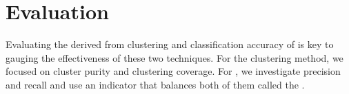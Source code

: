 \chapter{Evaluation}\label{chap:evaluation}
Evaluating the \bslongs{} derived from \dbased{} clustering and classification accuracy of \krap{} is key to gauging the effectiveness of these two techniques.
For the \dbased{} clustering method, we focused on cluster purity and clustering coverage.
For \krap{}, we investigate precision and recall and use an indicator that balances both of them called the \fmeasure{}.


